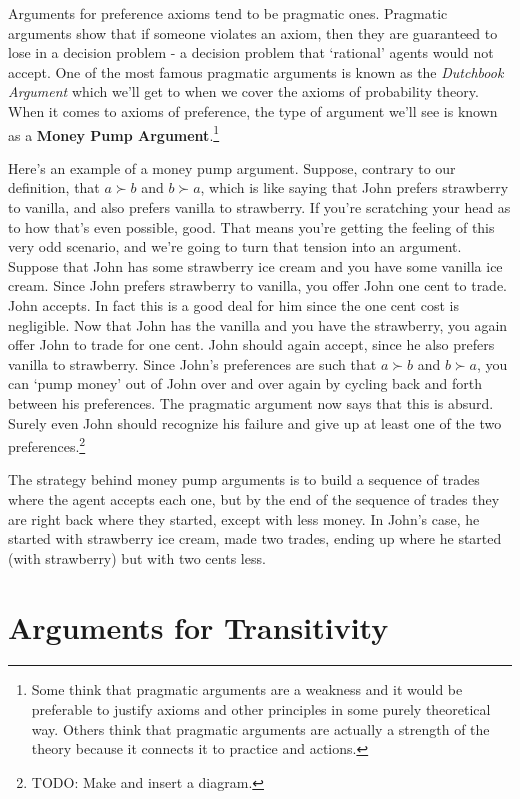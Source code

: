 \documentclass[]{tufte-book}
\begin{document}
Arguments for preference axioms tend to be pragmatic ones. Pragmatic arguments show that if someone violates an axiom, then they are guaranteed to lose in a decision problem - a decision problem that `rational' agents would not accept. One of the most famous pragmatic arguments is known as the \emph{Dutchbook Argument} which we'll get to when we cover the axioms of probability theory. When it comes to axioms of preference, the type of argument we'll see is known as a \textbf{Money Pump Argument}.\footnote{Some think that pragmatic arguments are a weakness and it would be preferable to justify axioms and other principles in some purely theoretical way. Others think that pragmatic arguments are actually a strength of the theory because it connects it to practice and actions.}

Here's an example of a money pump argument. Suppose, contrary to our definition, that \(a\succ b\) and \(b\succ a\), which is like saying that John prefers strawberry to vanilla, and also prefers vanilla to strawberry. If you're scratching your head as to how that's even possible, good. That means you're getting the feeling of this very odd scenario, and we're going to turn that tension into an argument. Suppose that John has some strawberry ice cream and you have some vanilla ice cream. Since John prefers strawberry to vanilla, you offer John one cent to trade. John accepts. In fact this is a good deal for him since the one cent cost is negligible. Now that John has the vanilla and you have the strawberry, you again offer John to trade for one cent. John should again accept, since he also prefers vanilla to strawberry. Since John's preferences are such that \(a\succ b\) and \(b\succ a\), you can `pump money' out of John over and over again by cycling back and forth between his preferences. The pragmatic argument now says that this is absurd. Surely even John should recognize his failure and give up at least one of the two preferences.\footnote{TODO: Make and insert a diagram.}

The strategy behind money pump arguments is to build a sequence of trades where the agent accepts each one, but by the end of the sequence of trades they are right back where they started, except with less money. In John's case, he started with strawberry ice cream, made two trades, ending up where he started (with strawberry) but with two cents less.

\hypertarget{arguments-for-transitivity}{%
\section{Arguments for Transitivity}\label{arguments-for-transitivity}}
\end{document}
